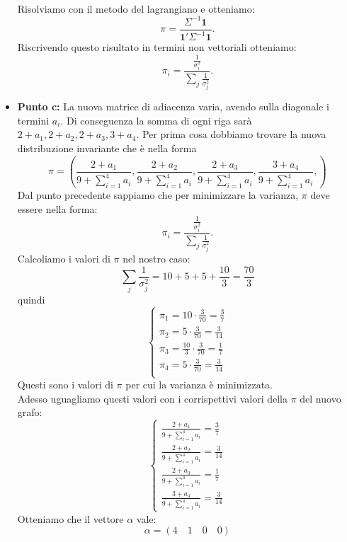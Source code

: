 \documentclass[a4paper,12pt]{article}
\begin{document}
\begin{itemize}
\[\begin{aligned}
		\end{aligned}
		\]
		Risolviamo con il metodo del lagrangiano e otteniamo:\\
		\[
		\pi = \frac{\Sigma^{-1} \mathbf{1}}{\mathbf{1}' \Sigma^{-1} \mathbf{1}}.
		\]
		Riscrivendo questo risultato in termini non vettoriali otteniamo:\\
		\[
		\pi_i = \frac{\frac{1}{\sigma_i^2}}{\sum_j \frac{1}{\sigma_j^2}}.
		\]
		\item \textbf{Punto c: }
		La nuova matrice di adiacenza varia, avendo sulla diagonale i termini $a_i$. Di conseguenza la somma di ogni riga sarà $2+a_1, 2+a_2, 2+a_3, 3+a_4$. Per prima cosa dobbiamo trovare la nuova distribuzione invariante che è nella forma\\
		\[
		\pi=(\frac{2+a_1}{9+\sum_{i=1}^4 a_i},\frac{2+a_2}{9+\sum_{i=1}^4 a_i},\frac{2+a_3}{9+\sum_{i=1}^4 a_i},\frac{3+a_4}{9+\sum_{i=1}^4 a_i},)
		\]
		Dal punto precedente sappiamo che per minimizzare la varianza, $\pi$ deve essere nella forma:\\
		\[
		\pi_i = \frac{\frac{1}{\sigma_i^2}}{\sum_j \frac{1}{\sigma_j^2}}.
		\]
		Calcoliamo i valori di $\pi$ nel nostro caso:\\
		\[
		\sum_j \frac{1}{\sigma_j^2}=10+5+5+\frac{10}{3}=\frac{70}{3}
		\]
		quindi\\
		\[
		\begin{cases}
			\pi_1=10 \cdot \frac{3}{70}=\frac{3}{7}\\
			\pi_2=5 \cdot \frac{3}{70}=\frac{3}{14}\\
			\pi_3=\frac{10}{3} \cdot \frac{3}{70}=\frac{1}{7}\\
			\pi_4=5 \cdot \frac{3}{70}=\frac{3}{14}\\
		\end{cases}
		\]
		Questi sono i valori di $\pi$ per cui la varianza è minimizzata.\\
		Adesso uguagliamo questi valori con i corrispettivi valori della $\pi$ del nuovo grafo:\\
		\[
		\begin{cases}
			\frac{2+a_1}{9+\sum_{i=1}^4 a_i}=\frac{3}{7}\\
			\frac{2+a_2}{9+\sum_{i=1}^4 a_i}=\frac{3}{14}\\
			\frac{2+a_3}{9+\sum_{i=1}^4 a_i}=\frac{1}{7}\\
			\frac{3+a_4}{9+\sum_{i=1}^4 a_i}=\frac{3}{14}
		\end{cases}
		\]
		Otteniamo che il vettore $\alpha$ vale:\\
		\[
		\alpha=(4\quad 1\quad 0\quad 0)
\]
\end{itemize}
\end{document}
